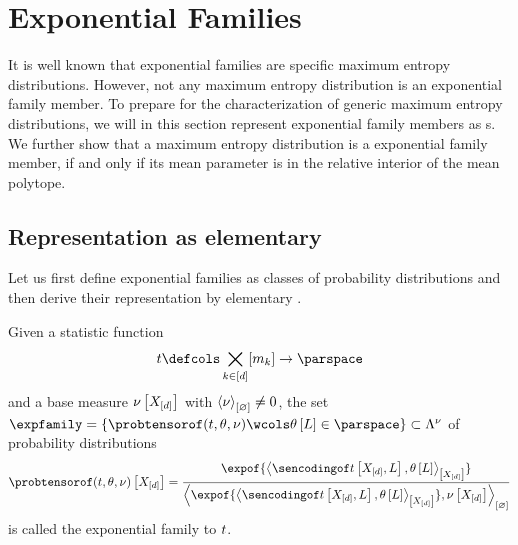 \section{Exponential Families}\label{sec:expFamily}

It is well known that exponential families are specific maximum entropy distributions.
However, not any maximum entropy distribution is an exponential family member.
To prepare for the characterization of generic maximum entropy distributions, we will in this section represent exponential family members as \ComputationActivationNetwork{}s.
We further show that a maximum entropy distribution is a exponential family member, if and only if its mean parameter is in the relative interior of the mean polytope.

\subsection{Representation as elementary \ComputationActivationNetworks{}}

Let us first define exponential families as classes of probability distributions and then derive their representation by elementary \ComputationActivationNetworks{}.

\begin{definition}
    \label{def:expFamily}
    Given a statistic function
    \begin{align*}
        \sstat \defcols \facstates \rightarrow \parspace
    \end{align*}
    and a base measure $\nu\left[X_{[d]}\right]$
    with $\left\langle \nu\right\rangle_{\left[ \varnothing \right]}\neq0$, the set $\expfamily=\{\expdist\wcols\canparamwithin\}\subset\distmeasuredby{\basemeasure}$ of probability distributions
    \begin{align*}
        \expdistat{\shortcatvariables}
        = \frac{
            \expof{\contractionof{\sencsstatat{\shortcatvariables,\selvariable},\canparamwith}{\shortcatvariables}}
        }{
            \contraction{\expof{\contractionof{\sencsstatat{\shortcatvariables,\selvariable},\canparamwith}{\shortcatvariables}},\basemeasurewith}
        }
    \end{align*}
    is called the exponential family to $t$.
\end{definition}

